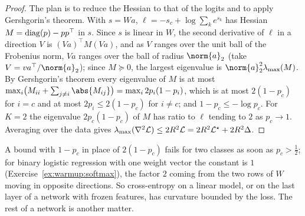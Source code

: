 \begin{refsection}

\begin{proof}
The plan is to reduce the Hessian to that of the logits and to apply Gershgorin's theorem. With $s=Wa$, $\ell=-s_c+\log\sum_ke^{s_k}$ has Hessian $M=\operatorname{diag}(p)-pp^\top$ in $s$. Since $s$ is linear in $W$, the second derivative of $\ell$ in a direction $V$ is $(Va)^\top M(Va)$, and as $V$ ranges over the unit ball of the Frobenius norm, $Va$ ranges over the ball of radius $\norm{a}_2$ (take $V=va^\top/\norm{a}_2$); since $M\succeq0$, the largest eigenvalue is $\norm{a}_2^2\lmax(M)$. By Gershgorin's theorem every eigenvalue of $M$ is at most $\max_i\bigl(M_{ii}+\sum_{j\ne i}\abs{M_{ij}}\bigr)=\max_i2p_i(1-p_i)$, which is at most $2(1-p_c)$ for $i=c$ and at most $2p_i\le2(1-p_c)$ for $i\ne c$; and $1-p_c\le-\log p_c$. For $K=2$ the eigenvalue $2p_c(1-p_c)$ of $M$ has ratio to $\ell$ tending to $2$ as $p_c\to1$. Averaging over the data gives $\lambda_{\max}(\nabla^2\mathcal{L})\le2R^2\mathcal{L}=2R^2\mathcal{L}^\star+2R^2\Delta$.
\end{proof}

A bound with $1-p_c$ in place of $2(1-p_c)$ fails for two classes as soon as $p_c>\frac12$; for binary logistic regression with one weight vector the constant is $1$ (Exercise~\ref{ex:warmup:softmax}), the factor $2$ coming from the two rows of $W$ moving in opposite directions. So cross-entropy on a linear model, or on the last layer of a network with frozen features, has curvature bounded by the loss. The rest of a network is another matter.



\end{refsection}
